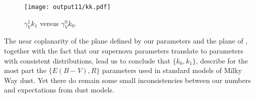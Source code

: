 \documentclass{aastex61}   	%
\begin{document}
\begin{figure}[htbp] %
   \centering
   \texttt{[image: output11/kk.pdf]}
      \caption{$\gamma^1_V k_1$ versus $\gamma^0_V k_0$.
   \label{kk:fig}}
\end{figure}
%
%
%

%

The near coplanarity of the plane defined by our parameters and the plane of  , together with the fact that our  supernova
parameters translate to   parameters with consistent distributions, lead us to conclude that 
$\{k_0, k_1\}$, describe for the most part the $\{ E(B-V), R\}$ parameters used
in standard models of Milky Way dust.  Yet there do remain some small inconsistencies between our numbers and expectations from dust models.
\end{document}
